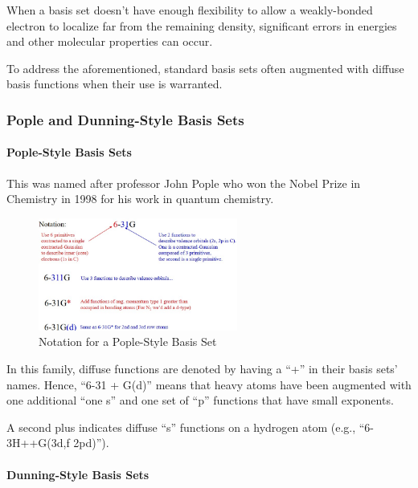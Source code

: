 \documentclass[
  letterpaper,
  DIV=11,
  numbers=noendperiod]{scrreprt}
\let\oldparagraph\paragraph
\renewcommand{\paragraph}[1]{\oldparagraph{#1}\mbox{}}
\begin{document}
When a basis set doesn't have enough flexibility to allow a
weakly-bonded electron to localize far from the remaining density,
significant errors in energies and other molecular properties can occur.

To address the aforementioned, standard basis sets often augmented with
diffuse basis functions when their use is warranted.

\hypertarget{pople-and-dunning-style-basis-sets}{%
\subsubsection{Pople and Dunning-Style Basis
Sets}\label{pople-and-dunning-style-basis-sets}}

\hypertarget{pople-style-basis-sets}{%
\paragraph{Pople-Style Basis Sets}\label{pople-style-basis-sets}}

This was named after professor John Pople who won the Nobel Prize in
Chemistry in 1998 for his work in quantum chemistry.

\begin{figure}

{\centering \includegraphics[width=2.57in,height=\textheight]{./images/wk2a/pople.jpg}

}

\caption{Notation for a Pople-Style Basis Set}

\end{figure}

In this family, diffuse functions are denoted by having a ``+'' in their
basis sets' names. Hence, ``6-31 + G(d)'' means that heavy atoms have
been augmented with one additional ``one s'' and one set of ``p''
functions that have small exponents.

A second plus indicates diffuse ``s'' functions on a hydrogen atom
(e.g., ``6-3H++G(3d,f 2pd)'').

\hypertarget{dunning-style-basis-sets}{%
\paragraph{Dunning-Style Basis Sets}\label{dunning-style-basis-sets}}
\end{document}
